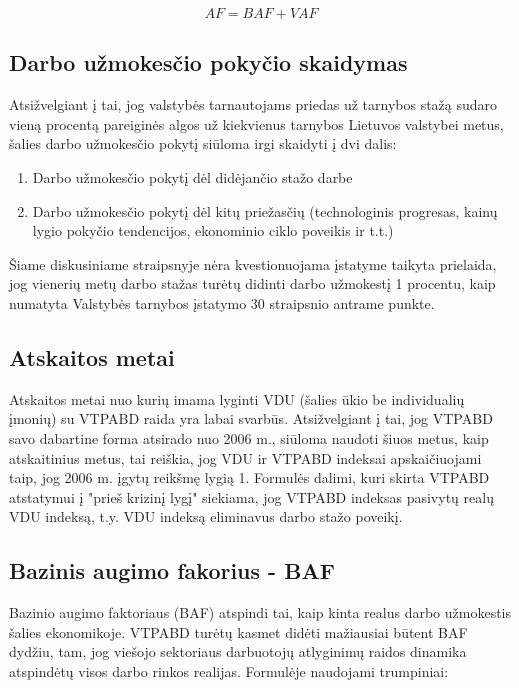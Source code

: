 \documentclass[titlepage, 11pt]{article}
\begin{document}
\begin{equation}
AF=BAF+VAF
\end{equation}

\subsection{Darbo užmokesčio pokyčio skaidymas}
Atsižvelgiant į tai, jog valstybės tarnautojams priedas už tarnybos stažą sudaro vieną procentą pareiginės algos už kiekvienus tarnybos Lietuvos valstybei metus, šalies darbo užmokesčio pokytį siūloma irgi skaidyti į dvi dalis:
\begin{enumerate}
\item Darbo užmokesčio pokytį dėl didėjančio stažo darbe
\item Darbo užmokesčio pokytį dėl kitų priežasčių (technologinis progresas, kainų lygio pokyčio tendencijos, ekonominio ciklo poveikis ir t.t.)
\end{enumerate}
Šiame diskusiniame straipsnyje nėra kvestionuojama įstatyme taikyta prielaida, jog vienerių metų darbo stažas turėtų didinti darbo užmokestį 1 procentu, kaip numatyta Valstybės tarnybos įstatymo 30 straipsnio antrame punkte.

\subsection{Atskaitos metai}
Atskaitos metai nuo kurių imama lyginti VDU (šalies ūkio be individualių įmonių) su  VTPABD raida yra labai svarbūs. Atsižvelgiant į tai, jog VTPABD savo dabartine forma atsirado nuo 2006 m., siūloma naudoti šiuos metus, kaip atskaitinius metus, tai reiškia, jog VDU ir VTPABD indeksai apskaičiuojami taip, jog 2006 m. įgytų reikšmę lygią 1. 
Formulės dalimi, kuri skirta VTPABD atstatymui į "prieš krizinį lygį" siekiama, jog VTPABD indeksas pasivytų realų VDU indeksą, t.y. VDU indeksą eliminavus darbo stažo poveikį.

\subsection{Bazinis augimo fakorius - BAF}
Bazinio augimo faktoriaus (BAF) atspindi tai, kaip kinta realus darbo užmokestis šalies ekonomikoje. VTPABD turėtų kasmet didėti mažiausiai būtent BAF dydžiu, tam, jog viešojo sektoriaus darbuotojų atlyginimų raidos dinamika atspindėtų visos darbo rinkos realijas. Formulėje naudojami trumpiniai:
\end{document}
